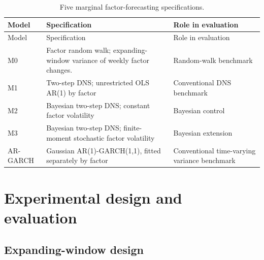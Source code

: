 \documentclass[
  12pt,
  letterpaper,
  DIV=11,
  numbers=noendperiod]{scrreprt}
\begin{document}
\begin{longtable}[]{@{}
  >{\raggedright\arraybackslash}p{}
  >{\raggedright\arraybackslash}p{}
  >{\raggedright\arraybackslash}p{}@{}}
\caption{Five marginal factor-forecasting
specifications.}\label{tbl-ladder}\tabularnewline
\toprule\noalign{}
\begin{minipage}[b]{\linewidth}\raggedright
Model
\end{minipage} & \begin{minipage}[b]{\linewidth}\raggedright
Specification
\end{minipage} & \begin{minipage}[b]{\linewidth}\raggedright
Role in evaluation
\end{minipage} \\
\midrule\noalign{}
\endfirsthead
\toprule\noalign{}
\begin{minipage}[b]{\linewidth}\raggedright
Model
\end{minipage} & \begin{minipage}[b]{\linewidth}\raggedright
Specification
\end{minipage} & \begin{minipage}[b]{\linewidth}\raggedright
Role in evaluation
\end{minipage} \\
\midrule\noalign{}
\endhead
\bottomrule\noalign{}
\endlastfoot
M0 & Factor random walk; expanding-window variance of weekly factor
changes. & Random-walk benchmark \\
M1 & Two-step DNS; unrestricted OLS AR(1) by factor & Conventional DNS
benchmark \\
M2 & Bayesian two-step DNS; constant factor volatility & Bayesian
control \\
M3 & Bayesian two-step DNS; finite-moment stochastic factor volatility &
Bayesian extension \\
AR-GARCH & Gaussian AR(1)-GARCH(1,1), fitted separately by factor &
Conventional time-varying variance benchmark \\
\end{longtable}

\chapter{Experimental design and evaluation}\label{sec-design}

\section{Expanding-window design}\label{expanding-window-design}
\end{document}
